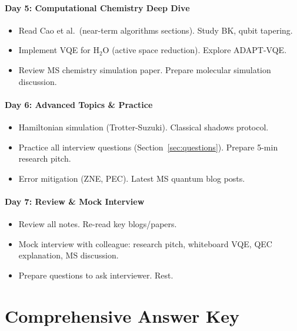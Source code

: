 \documentclass[11pt,a4paper]{article}
\begin{document}
\subsection*{Day 5: Computational Chemistry Deep Dive}
\begin{itemize}
    \item[\textbf{AM}] Read Cao et al.\ (near-term algorithms sections). Study BK, qubit tapering.
    \item[\textbf{PM}] Implement VQE for H$_2$O (active space reduction). Explore ADAPT-VQE.
    \item[\textbf{Eve}] Review MS chemistry simulation paper. Prepare molecular simulation discussion.
\end{itemize}

\subsection*{Day 6: Advanced Topics \& Practice}
\begin{itemize}
    \item[\textbf{AM}] Hamiltonian simulation (Trotter-Suzuki). Classical shadows protocol.
    \item[\textbf{PM}] Practice all interview questions (Section~\ref{sec:questions}). Prepare 5-min research pitch.
    \item[\textbf{Eve}] Error mitigation (ZNE, PEC). Latest MS quantum blog posts.
\end{itemize}

\subsection*{Day 7: Review \& Mock Interview}
\begin{itemize}
    \item[\textbf{AM}] Review all notes. Re-read key blogs/papers.
    \item[\textbf{PM}] Mock interview with colleague: research pitch, whiteboard VQE, QEC explanation, MS discussion.
    \item[\textbf{Eve}] Prepare questions to ask interviewer. Rest.
\end{itemize}


\newpage
\part{Comprehensive Answer Key}
\label{part:answers}
\end{document}
